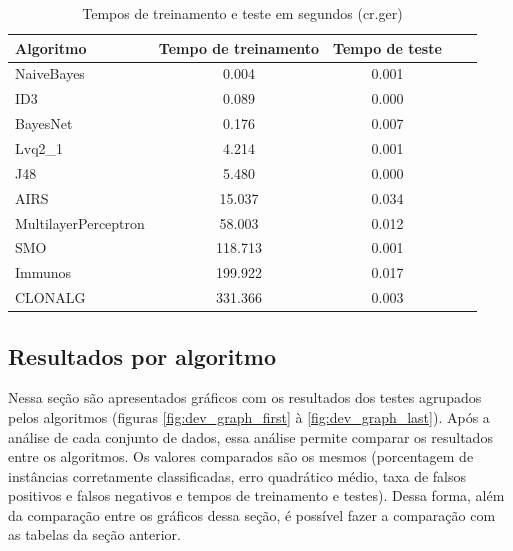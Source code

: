 \vspace{0.5cm}
\begin{table}[h!]
    \centering
    \caption{Tempos de treinamento e teste em segundos (cr.ger)}
    \label{tbl:dev_table_ger_times}
    \label{tbl:dev_table_last}
    \vspace{0.5cm}
    \begin{tabular}{|l|c|c|c|c|}
        \hline
        \textbf{Algoritmo} & \textbf{Tempo de treinamento} & \textbf{Tempo de teste} \\
        \hline
        \rowcolor[gray]{.9}
        NaiveBayes           &   0.004 & 0.001 \\ \hline
        \rowcolor[gray]{.9}
        ID3                  &   0.089 & 0.000 \\ \hline
        \rowcolor[gray]{.9}
        BayesNet             &   0.176 & 0.007 \\ \hline
        Lvq2\_1              &   4.214 & 0.001 \\ \hline
        J48                  &   5.480 & 0.000 \\ \hline
        AIRS                 &  15.037 & 0.034 \\ \hline
        MultilayerPerceptron &  58.003 & 0.012 \\ \hline
        SMO                  & 118.713 & 0.001 \\ \hline
        Immunos              & 199.922 & 0.017 \\ \hline
        CLONALG              & 331.366 & 0.003 \\ \hline
    \end{tabular}
\end{table}
\vspace{0.5cm}

\subsection{Resultados por algoritmo}

Nessa seção são apresentados gráficos com os resultados dos testes agrupados pelos algoritmos (figuras \ref{fig:dev_graph_first} à \ref{fig:dev_graph_last}). Após a análise de cada conjunto de dados, essa análise permite comparar os resultados entre os algoritmos. Os valores comparados são os mesmos (porcentagem de instâncias corretamente classificadas, erro quadrático médio, taxa de falsos positivos e falsos negativos e tempos de treinamento e testes). Dessa forma, além da comparação entre os gráficos dessa seção, é possível fazer a comparação com as tabelas da seção anterior.

